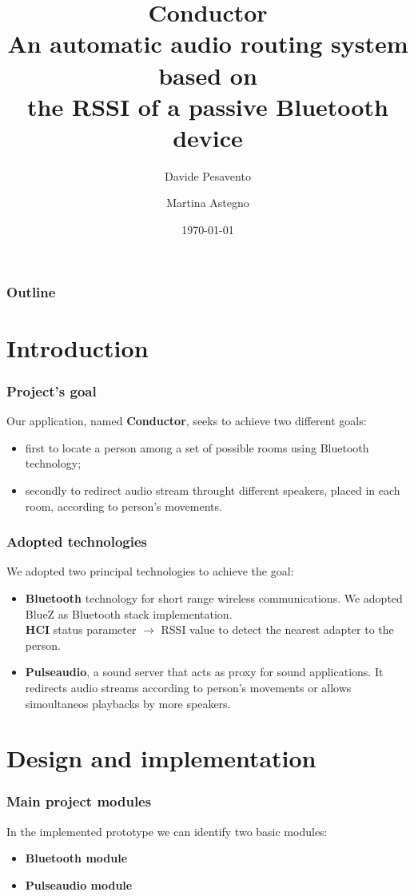 \documentclass{beamer}
\title{\textbf{Conductor} \\
	An automatic audio routing system based on \\
	the RSSI of a passive Bluetooth device}
\author{Davide Pesavento \and Martina Astegno}
\institute{Università degli Studi di Padova \\
	Corso di Laurea Magistrale in Informatica}
\date{\today}
\begin{document}
\begin{frame}[plain]
\titlepage
\end{frame}

\begin{frame}
\frametitle{Outline}
\tableofcontents
\end{frame}


\section{Introduction}

\begin{frame}
\frametitle{Project's goal}
Our application, named \textbf{Conductor}, seeks to achieve two different goals:
\begin{itemize}
	\item first to locate a person among a set of possible rooms using Bluetooth technology;
	\item secondly to redirect audio stream throught different speakers, placed in each room, according to person's movements.
\end{itemize}
\end{frame}

\begin{frame}
\frametitle{Adopted technologies}
We adopted two principal technologies to achieve the goal:
\begin{itemize}
	\item \textbf{Bluetooth} technology for short range wireless communications. We adopted BlueZ as Bluetooth stack implementation.\\ \textbf{HCI} status parameter $\rightarrow$ RSSI value to detect the nearest adapter to the person.
	\pause
	\item \textbf{Pulseaudio}, a sound server that acts as proxy for sound applications. It redirects audio streams according to person's movements or allows simoultaneos playbacks by more speakers.
\end{itemize}
\end{frame}


\section{Design and implementation}

\begin{frame}
\frametitle{Main project modules}
In the implemented prototype we can identify two basic modules:
\begin{itemize}
	\item \textbf{Bluetooth module}
	\item \textbf{Pulseaudio module}
	\end{itemize}
\end{frame}
\end{document}
